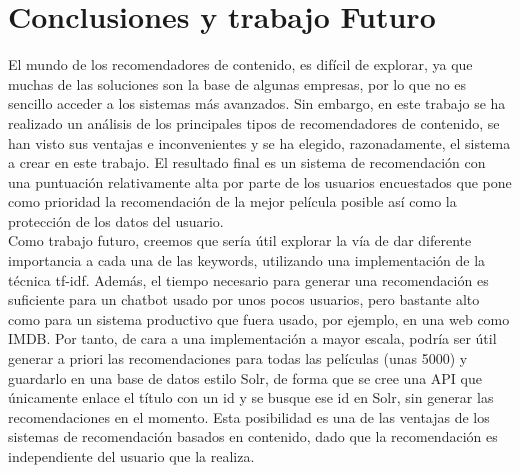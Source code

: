 \chapter{Conclusiones y trabajo Futuro}\label{chap:futuro}
El mundo de los recomendadores de contenido, es difícil de explorar, ya que muchas de las soluciones son la base de algunas empresas, por lo que no es sencillo acceder a los sistemas más avanzados. Sin embargo, en este trabajo se ha realizado un análisis de los principales tipos de recomendadores de contenido, se han visto sus ventajas e inconvenientes y se ha elegido, razonadamente, el sistema a crear en este trabajo. El resultado final es un sistema de recomendación con una puntuación relativamente alta por parte de los usuarios encuestados que pone como prioridad la recomendación de la mejor película posible así como la protección de los datos del usuario.\\

Como trabajo futuro, creemos que sería útil explorar la vía de dar diferente importancia a cada una de las keywords, utilizando una implementación de la técnica tf-idf. Además, el tiempo necesario para generar una recomendación es suficiente para un chatbot usado por unos pocos usuarios, pero bastante alto como para un sistema productivo que fuera usado, por ejemplo, en una web como IMDB. Por tanto, de cara a una implementación a mayor escala, podría ser útil generar a priori las recomendaciones para todas las películas (unas 5000) y guardarlo en una base de datos estilo Solr, de forma que se cree una API que únicamente enlace el título con un id y se busque ese id en Solr, sin generar las recomendaciones en el momento. Esta posibilidad es una de las ventajas de los sistemas de recomendación basados en contenido, dado que la recomendación es independiente del usuario que la realiza.